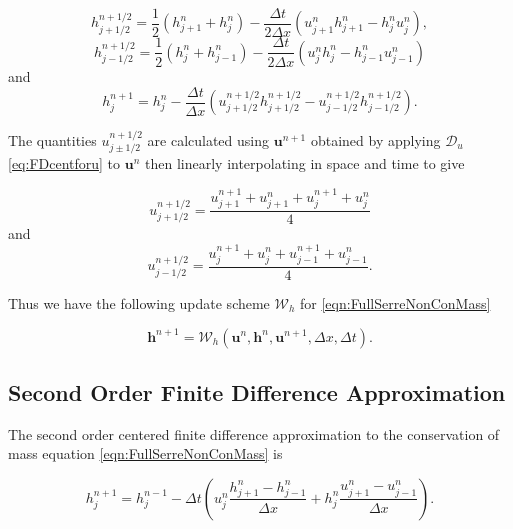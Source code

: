 	\begin{equation*}
	h^{n + 1/2}_{j+ 1/2} = \frac{1}{2}\left(h^{n}_{j+1} + h^{n}_j\right) - \frac{\Delta t}{2\Delta x}\left(u^n_{j+1}h^n_{j+1} - h^n_{j}u^n_{j}\right),
	\end{equation*}
	\begin{equation*}
	h^{n + 1/2}_{j- 1/2} = \frac{1}{2}\left(h^{n}_{j} + h^{n}_{j-1}\right) - \frac{\Delta t}{2\Delta x}\left(u^n_{j}h^n_{j} - h^n_{j-1}u^n_{j-1}\right)
	\end{equation*}
	and
	\begin{equation*}
	h^{n+1}_j = h^{n}_j - \frac{\Delta t}{\Delta x}\left(u^{n + 1/2}_{j+ 1/2}h^{n + 1/2}_{j+ 1/2} - u^{n + 1/2}_{j- 1/2}h^{n + 1/2}_{j- 1/2}\right).
	\label{eq:LW4h}
	\end{equation*}

The quantities $u^{n + 1/2}_{j \pm 1/2}$ are calculated using $\boldsymbol{u}^{n+1}$ obtained by applying $\mathcal{D}_u$ \eqref{eq:FDcentforu} to $\boldsymbol{u}^{n}$  then linearly interpolating in space and time to give

	\begin{equation*}
	u^{n + 1/2}_{j+ 1/2} = \frac{u^{n+1}_{j+1} + u^{n}_{j+1} + u^{n+1}_{j} + u^{n}_{j} }{4}
	\end{equation*}
	and
	\begin{equation*}
	u^{n + 1/2}_{j- 1/2} = \frac{u^{n+1}_{j} + u^{n}_{j} + u^{n+1}_{j-1}+ u^{n}_{j-1} }{4}.
	\end{equation*}

Thus we have the following update scheme $\mathcal{W}_h$ for \eqref{eqn:FullSerreNonConMass}

	\begin{equation}
	\boldsymbol{h}^{n+1} = \mathcal{W}_h\left(\boldsymbol{u}^n,\boldsymbol{h}^n,\boldsymbol{u}^{n+1}, \Delta x, \Delta t \right). 
	\label{eq:LWupdateh}
	\end{equation}

\subsection{Second Order Finite Difference Approximation}

The second order centered finite difference approximation to the conservation of mass equation \eqref{eqn:FullSerreNonConMass} is

	\begin{equation*}
	h^{n+1}_j = h^{n-1}_j - \Delta t \left(u^{n}_{j}\frac{h^{n}_{j+1} - h^{n}_{j-1}}{\Delta x} + h^{n}_{j}\frac{u^{n}_{j+1} - u^{n}_{j-1}}{\Delta x}\right).
	\end{equation*}

